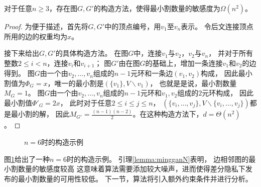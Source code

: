 \begin{lemma}
  \label{lemma:mingganN}
  对于任意$n\geq 3$，存在图$G,G'$的构造方法，使得最小割数量的敏感度为$\Omega(n^2)$。
\end{lemma}
\begin{proof}
  为便于描述，首先将$G,G'$中的顶点编号，用$v_1$至$v_n$表示。
  令后文连接顶点所用的边的权重均为$x$。

  接下来给出$G,G'$的具体构造方法。
  在图$G$中，连接$v_1$与$v_2$，$v_2$与$v_n$，
  并对于所有整数$2\leq i<n$，连接$v_i$和$v_{i+1}$；
  图$G'$由在图$G$的基础上，增加一条连接$v_1$和$v_2$的边得到。
  图$G$由一个由$v_2,\dots,v_n$组成的$n-1$元环和一条边$(v_1,v_2)$构成，
  因此最小割值为$\Phi_G=x$，唯一的最小割是$(\{v_1\},V\backslash v_1)$，
  也就是是说，最小割数量$M_G=1$。
  图$G$由一个由$v_2,\dots,v_n$组成的$n-1$元环和$v_1,v_2$组成的$2$元环构成，
  因此最小割值$\Phi'_G=2x$，
  此时对于任意$2\leq i\leq j\leq n$，
  $(\{v_i,\ldots,v_j\},V\backslash \{v_i,\ldots,v_j\})$都是最小割的解，
  因此$M_{G'}=\frac{(n-1)(n-2)}2$。在这种构造方法下，$d=\Theta(n^2)$。
\end{proof}
\begin{figure}[htb]
    \centering
    \hspace{4em}
    \caption{$n=6$时的构造示例}
    \label{fig:exA}
\end{figure}
图\ref{fig:exA}给出了一种$n=6$时的构造示例。
引理\ref{lemma:mingganN}表明，
边相邻图的最小割数量的敏感度较高
这意味着算法需要添加较大噪声，进而使得差分隐私下发布的最小割数量的可用性较低。
下一节，算法将引入额外约束条件并进行分析。
